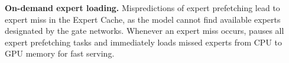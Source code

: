 \textbf{On-demand expert loading.}
Mispredictions of expert prefetching lead to expert miss in the Expert Cache, as the \MoE model cannot find available experts designated by the gate networks.
Whenever an expert miss occurs, \sys pauses all expert prefetching tasks and immediately loads missed experts from CPU to GPU memory for fast serving.


